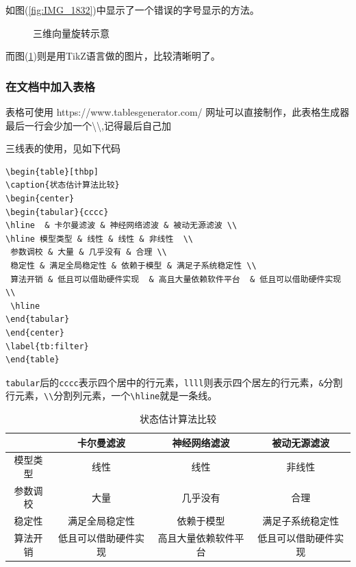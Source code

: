 如图(\ref{fig:IMG_1832})中显示了一个错误的字号显示的方法。
\begin{figure}[h]
\centering
{}
\caption{三维向量旋转示意}
\label{fig:3Drot}
\end{figure}

而图(\ref{fig:3Drot})则是用TikZ语言做的图片，比较清晰明了。
\subsubsection{在文档中加入表格}

表格可使用 https://www.tablesgenerator.com/ 网址可以直接制作，此表格生成器最后一行会少加一个\textbackslash\textbackslash,记得最后自己加

三线表的使用，见如下代码
\begin{verbatim}
\begin{table}[thbp]
\caption{状态估计算法比较}
\begin{center}
\begin{tabular}{cccc}
\hline  & 卡尔曼滤波 & 神经网络滤波 & 被动无源滤波 \\ 
\hline 模型类型 & 线性 & 线性 & 非线性  \\ 
 参数调校 & 大量 & 几乎没有 & 合理 \\ 
 稳定性 & 满足全局稳定性 & 依赖于模型 & 满足子系统稳定性 \\ 
 算法开销 & 低且可以借助硬件实现  & 高且大量依赖软件平台  & 低且可以借助硬件实现  \\ 
 \hline
\end{tabular} 
\end{center}
\label{tb:filter}
\end{table}
\end{verbatim}
\verb|tabular|后的\verb|cccc|表示四个居中的行元素，\verb|llll|则表示四个居左的行元素，\verb|&|分割行元素，\verb|\\|分割列元素，一个\verb|\hline|就是一条线。
\begin{table}[thbp]
\caption{状态估计算法比较}
\begin{center}
\begin{tabular}{cccc}
\hline  & 卡尔曼滤波 & 神经网络滤波 & 被动无源滤波 \\ 
\hline 模型类型 & 线性 & 线性 & 非线性  \\ 
 参数调校 & 大量 & 几乎没有 & 合理 \\ 
 稳定性 & 满足全局稳定性 & 依赖于模型 & 满足子系统稳定性 \\ 
 算法开销 & 低且可以借助硬件实现  & 高且大量依赖软件平台  & 低且可以借助硬件实现  \\ 
 \hline
\end{tabular} 
\end{center}
\label{tb:filter}
\end{table}

